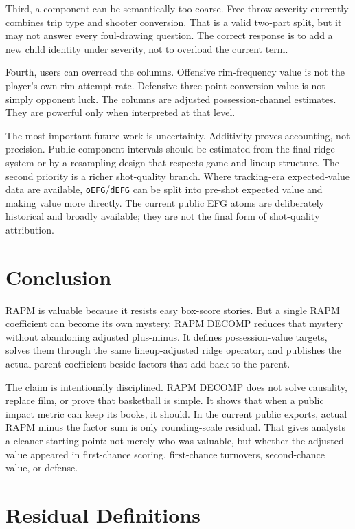 \documentclass[11pt]{article}
\begin{document}
Third, a component can be semantically too coarse.  Free-throw severity
currently combines trip type and shooter conversion.  That is a valid two-part
split, but it may not answer every foul-drawing question.  The correct response
is to add a new child identity under severity, not to overload the current term.

Fourth, users can overread the columns.  Offensive rim-frequency value is not
the player's own rim-attempt rate.  Defensive three-point conversion value is
not simply opponent luck.  The columns are adjusted possession-channel
estimates.  They are powerful only when interpreted at that level.

The most important future work is uncertainty.  Additivity proves accounting,
not precision.  Public component intervals should be estimated from the final
ridge system or by a resampling design that respects game and lineup structure.
The second priority is a richer shot-quality branch.  Where tracking-era
expected-value data are available, \texttt{oEFG}/\texttt{dEFG} can be split
into pre-shot expected value and making value more directly.  The current
public EFG atoms are deliberately historical and broadly available; they are
not the final form of shot-quality attribution.

\section{Conclusion}

RAPM is valuable because it resists easy box-score stories.  But a single RAPM
coefficient can become its own mystery.  RAPM DECOMP reduces that mystery
without abandoning adjusted plus-minus.  It defines possession-value targets,
solves them through the same lineup-adjusted ridge operator, and publishes the
actual parent coefficient beside factors that add back to the parent.

The claim is intentionally disciplined.  RAPM DECOMP does not solve causality,
replace film, or prove that basketball is simple.  It shows that when a public
impact metric can keep its books, it should.  In the current public exports,
actual RAPM minus the factor sum is only rounding-scale residual.  That gives
analysts a cleaner starting point: not merely who was valuable, but whether the
adjusted value appeared in first-chance scoring, first-chance turnovers,
second-chance value, or defense.

\appendix

\section{Residual Definitions}
\end{document}
